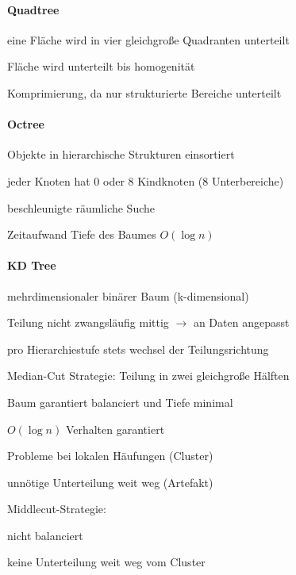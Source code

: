 \documentclass[landscape]{article}
\begin{document}
\begin{multicols}{3}
  \paragraph{Quadtree}
  \begin{itemize*}
    \item eine Fläche wird in vier gleichgroße Quadranten unterteilt
    \item Fläche wird unterteilt bis homogenität
    \item Komprimierung, da nur strukturierte Bereiche unterteilt
  \end{itemize*}
  
  \paragraph{Octree}
  \begin{itemize*}
    \item Objekte in hierarchische Strukturen einsortiert
    \item jeder Knoten hat 0 oder 8 Kindknoten (8 Unterbereiche)
    \item beschleunigte räumliche Suche
    \item Zeitaufwand Tiefe des Baumes $O(\log n)$
  \end{itemize*}
  
  \paragraph{KD Tree}
  \begin{itemize*}
    \item mehrdimensionaler binärer Baum (k-dimensional)
    \item Teilung nicht zwangsläufig mittig $\rightarrow$ an Daten angepasst
    \item pro Hierarchiestufe stets wechsel der Teilungsrichtung
    \item Median-Cut Strategie: Teilung in zwei gleichgroße Hälften
    \begin{itemize*}
      \item Baum garantiert balanciert und Tiefe minimal
      \item $O(\log n)$ Verhalten garantiert
      \item Probleme bei lokalen Häufungen (Cluster)
      \item unnötige Unterteilung weit weg (Artefakt)
    \end{itemize*}
    \item Middlecut-Strategie:
    \begin{itemize*}
      \item nicht balanciert
      \item keine Unterteilung weit weg vom Cluster
    \end{itemize*}
  \end{itemize*}
  

\end{multicols}
\end{document}
